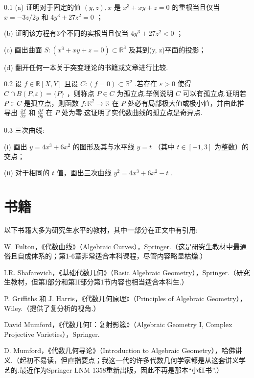 0.1 (a) 证明对于固定的值 \(\left( {y,z}\right) ,x\) 是 \({x}^{3} + {xy} + z = 0\) 的重根当且仅当 \(x =  - {3z}/{2y}\) 和 \(4{y}^{3} + {27}{z}^{2} = 0\) ；

(b) 证明该方程有3个不同的实根当且仅当 \(4{y}^{3} + {27}{z}^{2} < 0\) ；

(c) 画出曲面 \(S : \left( {{x}^{3} + {xy} + z = 0}\right)  \subset  {\mathbb{R}}^{3}\) 及其到(y, z)平面的投影；

(d) 翻开任何一本关于突变理论的书籍或文章进行比较.

0.2 设 \(f \in  \mathbb{R}\left\lbrack  {X,Y}\right\rbrack\) 且设 \(C : \left( {f = 0}\right)  \subset  {\mathbb{R}}^{2}\) .若存在 \(\varepsilon  > 0\) 使得 \(C \cap  B\left( {P,\varepsilon }\right)  = \{P\}\) ，则称点 \(P \in  C\) 为孤立点.举例说明 \(C\) 可以有孤立点.证明若 \(P \in  C\) 是孤立点，则函数 \(f : {\mathbb{R}}^{2} \rightarrow  \mathbb{R}\) 在 \(P\) 处必有局部极大值或极小值，并由此推导出 \(\frac{\partial f}{\partial x}\) 和 \(\frac{\partial f}{\partial y}\) 在 \(P\) 处为零.这证明了实代数曲线的孤立点是奇异点.

0.3 三次曲线:

(i) 画出 \(y = 4{x}^{3} + 6{x}^{2}\) 的图形及其与水平线 \(y = t\) （其中 \(t \in  \left\lbrack  {-1,3}\right\rbrack\) 为整数）的交点；

(ii) 对于相同的 \(t\) 值，画出三次曲线 \({y}^{2} = 4{x}^{3} + 6{x}^{2} - t\) .

\section*{书籍}

以下书籍大多为研究生水平的教材，其中一部分在正文中有引用:

W. Fulton，《代数曲线》（Algebraic Curves），Springer.（这是研究生教材中最通俗且自成体系的；第1-6章非常适合本科课程，尽管内容略显枯燥.）

I.R. Shafarevich，《基础代数几何》（Basic Algebraic Geometry），Springer.（研究生教材，但第I部分和第II部分第1节内容也相当适合本科生.）

P. Griffiths 和 J. Harris，《代数几何原理》（Principles of Algebraic Geometry），Wiley.（提供了复分析的视角.）

David Mumford，《代数几何I：复射影簇》（Algebraic Geometry I, Complex Projective Varieties），Springer.

D. Mumford，《代数几何导论》（Introduction to Algebraic Geometry），哈佛讲义.（起初不易读，但直指要点；我这一代的许多代数几何学家都是从这套讲义学艺的.最近作为Springer LNM 1358重新出版，因此不再是那本“小红书”.）

